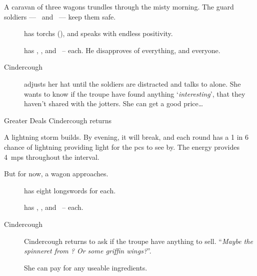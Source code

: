 \documentclass[10pt,twoside]{book}
\begin{document}
A caravan of three wagons trundles through the misty morning.
The \gls{guard} \glspl{soldier} --- \composeHumanName\ and \composeHumanName\ --- keep them safe.

\begin{description}
  \item[\composeHumanName]
  has \glspl{torch} (), and speaks with endless positivity.
  \item[\composeHumanName]
  has \rations, \rations, and \rations\ --  each.
  He disapproves of everything, and everyone.
  \item[Cindercough]
  adjusts her hat until the \glspl{soldier} are distracted and talks to  alone.
  She wants to know if the troupe have found anything `\emph{interesting}', that they haven't shared with the \glspl{jotter}.
  She can get a good price\ldots
\end{description}

{Greater Deals}%
{Cindercough returns}%

A lightning storm builds.
By evening, it will break, and each \gls{round} has a 1 in 6 chance of lightning providing light for the \glspl{pc} to see by.
The energy provides 4~\glspl{mp} throughout the \gls{interval}.

But for now, a wagon approaches.

\begin{description}
  \item[\composeHumanName]
  has eight longswords for  each.
  \item[\composeHumanName]
  has \rations, \rations, and \rations\ --  each.
  \item[Cindercough]
  Cindercough returns to ask if the troupe have anything to sell.
  ``\textit{Maybe the spinneret from ?  Or some \gls{griffin} wings?}''.

  She can pay  for any useable \glspl{ingredient}.
\end{description}
\end{document}
